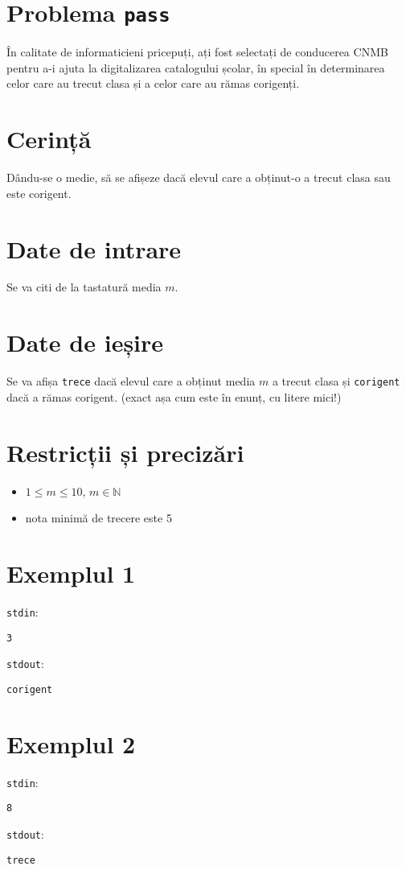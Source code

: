 \documentclass{scrartcl}
\author{Test Tutors of CNMB Informatică}
\date{16 februarie 2024}
\begin{document}
\section*{Problema \texttt{pass}}
În calitate de informaticieni pricepuți, ați fost selectați de conducerea CNMB pentru a-i ajuta la digitalizarea catalogului școlar,
în special în determinarea celor care au trecut clasa și a celor care au rămas corigenți.
\section*{Cerință}
Dându-se o medie, să se afișeze dacă elevul care a obținut-o a trecut clasa sau este corigent.
\section*{Date de intrare}
Se va citi de la tastatură media $m$.
\section*{Date de ieșire}
Se va afișa \texttt{trece} dacă elevul care a obținut media $m$ a trecut clasa și \texttt{corigent} dacă a rămas corigent.
(exact așa cum este în enunț, cu litere mici!)
\section*{Restricții și precizări}
\begin{itemize}
    \item $1 \leq m \leq 10$, $m \in \mathbb{N}$
    \item nota minimă de trecere este 5
\end{itemize}

{
\parindent0pt
    
\section*{Exemplul 1}
\texttt{stdin}:
    \begin{lstlisting}
3
    \end{lstlisting}

\texttt{stdout}:
    \begin{lstlisting}
corigent
    \end{lstlisting}

\section*{Exemplul 2}
\texttt{stdin}:
    \begin{lstlisting}
8
    \end{lstlisting}

\texttt{stdout}:
    \begin{lstlisting}
trece
    \end{lstlisting}
}
\end{document}
